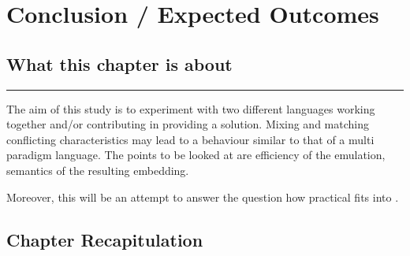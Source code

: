 \documentclass[thesis-solanki.tex]{subfiles}
\begin{document}
\chapter{Conclusion / Expected Outcomes}\label{chap:conclusion}


\section{What this chapter is about}

\noindent\rule{\textwidth}{0.5pt}


\begin{comment}
As we have seen there have been a number of attempts at solving the problem and so have been the issues. First and foremost, with appropriate  documentation the resulting library should be easy to use. Writing a program must be very much the same as writing a program in the host language. With the introduction of few new constructs defining
\end{comment}

The aim of this study is to experiment with two different languages working together and/or contributing in providing a solution. Mixing and matching conflicting characteristics may lead to a behaviour similar to that of a multi paradigm language. The points to be looked at are efficiency of the emulation, semantics of the resulting embedding.

Moreover, this will be an attempt to answer the question how practical  fits into .                  


\section{Chapter Recapitulation}

\ifMain
\begin{scope}
  \nolinenumbers
  \enotesize
  \par
  \begin{singlespace}
  \setlength{\parskip}{12pt plus 2pt minus 1pt}
  \theendnotes
  \par
  \end{singlespace}
\end{scope}
\fi
\end{document}
